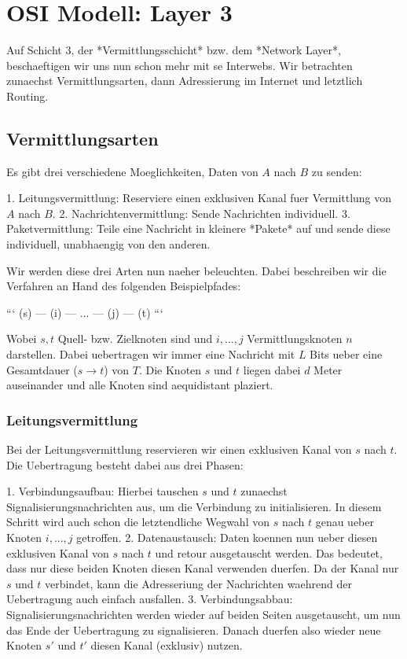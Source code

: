 \section{OSI Modell: Layer 3} 

Auf Schicht 3, der *Vermittlungsschicht* bzw. dem *Network Layer*, beschaeftigen
wir uns nun schon mehr mit se Interwebs. Wir betrachten zunaechst
Vermittlungsarten, dann Adressierung im Internet und letztlich Routing.

\subsection{Vermittlungsarten} 

Es gibt drei verschiedene Moeglichkeiten, Daten von $A$ nach $B$ zu senden:

1. Leitungsvermittlung: Reserviere einen exklusiven Kanal fuer Vermittlung von
   $A$ nach $B$.
2. Nachrichtenvermittlung: Sende Nachrichten individuell.
3. Paketvermittlung: Teile eine Nachricht in kleinere *Pakete* auf und sende
   diese individuell, unabhaengig von den anderen.

Wir werden diese drei Arten nun naeher beleuchten. Dabei beschreiben wir die
Verfahren an Hand des folgenden Beispielpfades:

```
(s) --- (i) --- ... --- (j) --- (t)
```

Wobei $s, t$ Quell- bzw. Zielknoten sind und $i, ..., j$ Vermittlungsknoten $n$
darstellen. Dabei uebertragen wir immer eine Nachricht mit $L$ Bits ueber eine
Gesamtdauer ($s \rightarrow t$) von $T$. Die Knoten $s$ und $t$ liegen dabei $d$
Meter auseinander und alle Knoten sind aequidistant plaziert.

\subsubsection{Leitungsvermittlung} 

Bei der Leitungsvermittlung reservieren wir einen exklusiven Kanal von $s$ nach
$t$. Die Uebertragung besteht dabei aus drei Phasen:

1. Verbindungsaufbau: Hierbei tauschen $s$ und $t$ zunaechst
   Signalisierungsnachrichten aus, um die Verbindung zu initialisieren. In
   diesem Schritt wird auch schon die letztendliche Wegwahl von $s$ nach $t$
   genau ueber Knoten $i, ..., j$ getroffen.
2. Datenaustausch: Daten koennen nun ueber diesen exklusiven Kanal von $s$ nach
   $t$ und retour ausgetauscht werden. Das bedeutet, dass nur diese beiden
   Knoten diesen Kanal verwenden duerfen. Da der Kanal nur $s$ und $t$
   verbindet, kann die Adresseriung der Nachrichten waehrend der Uebertragung
   auch einfach ausfallen.
3. Verbindungsabbau: Signalisierungsnachrichten werden wieder auf beiden Seiten
   ausgetauscht, um nun das Ende der Uebertragung zu signalisieren. Danach
   duerfen also wieder neue Knoten $s'$ und $t'$ diesen Kanal (exklusiv) nutzen.

